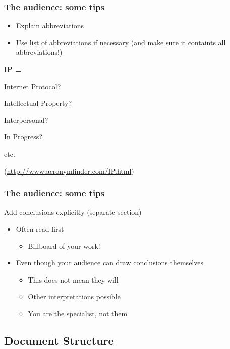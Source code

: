 \documentclass[aspectratio=169]{beamer}
\begin{document}
\begin{frame}
  \frametitle{The audience: some tips}
  
  \begin{itemize}
    \item Explain abbreviations
    \item Use list of abbreviations if necessary (and make sure it containts all abbreviations!)
  \end{itemize}
  
  \vfill \centering
  
  \textbf{IP =}
  
  Internet Protocol?
  
  Intellectual Property?
  
  Interpersonal?
  
  In Progress?
  
  etc.
  
  (\url{http://www.acronymfinder.com/IP.html})
  
\end{frame}

\begin{frame}
  \frametitle{The audience: some tips}
  
  Add conclusions explicitly (separate section)
  
  \begin{itemize}
    \item Often read first
    \begin{itemize}
      \item Billboard of your work!
    \end{itemize}
    \item Even though your audience can draw conclusions themselves
    \begin{itemize}
      \item This does not mean they will
      \item Other interpretations possible
      \item You are the specialist, not them
    \end{itemize}
  \end{itemize}
\end{frame}

\subsection{Document Structure}
\end{document}
